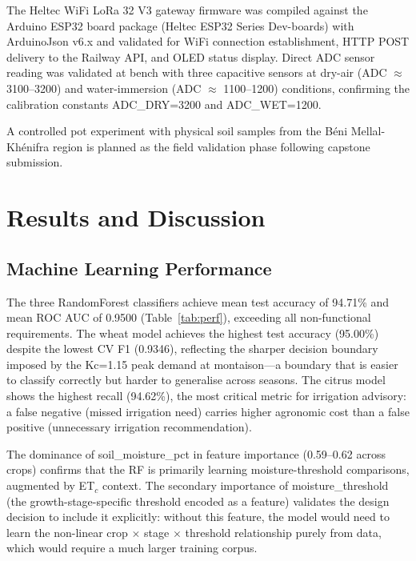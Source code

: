 \documentclass[12pt,a4paper]{report}
\begin{document}
The Heltec WiFi LoRa 32 V3 gateway firmware was compiled against the Arduino ESP32 board package (Heltec ESP32 Series Dev-boards) with ArduinoJson v6.x and validated for WiFi connection establishment, HTTP POST delivery to the Railway API, and OLED status display. Direct ADC sensor reading was validated at bench with three capacitive sensors at dry-air (ADC $\approx$ 3100--3200) and water-immersion (ADC $\approx$ 1100--1200) conditions, confirming the calibration constants ADC\_DRY=3200 and ADC\_WET=1200.

A controlled pot experiment with physical soil samples from the Béni Mellal-Khénifra region is planned as the field validation phase following capstone submission.

\chapter{Results and Discussion}

\section{Machine Learning Performance}

The three RandomForest classifiers achieve mean test accuracy of 94.71\% and mean ROC AUC of 0.9500 (Table~\ref{tab:perf}), exceeding all non-functional requirements. The wheat model achieves the highest test accuracy (95.00\%) despite the lowest CV F1 (0.9346), reflecting the sharper decision boundary imposed by the Kc=1.15 peak demand at montaison---a boundary that is easier to classify correctly but harder to generalise across seasons. The citrus model shows the highest recall (94.62\%), the most critical metric for irrigation advisory: a false negative (missed irrigation need) carries higher agronomic cost than a false positive (unnecessary irrigation recommendation).

The dominance of soil\_moisture\_pct in feature importance (0.59--0.62 across crops) confirms that the RF is primarily learning moisture-threshold comparisons, augmented by ET$_c$ context. The secondary importance of moisture\_threshold (the growth-stage-specific threshold encoded as a feature) validates the design decision to include it explicitly: without this feature, the model would need to learn the non-linear crop $\times$ stage $\times$ threshold relationship purely from data, which would require a much larger training corpus.
\end{document}
